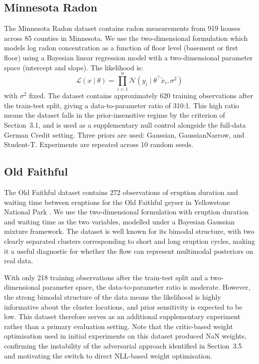 \subsection{Minnesota Radon}

The Minnesota Radon dataset \citep{gelman2007} contains radon measurements 
from 919 houses across 85 counties in 
Minnesota. We use the two-dimensional 
formulation which models log radon 
concentration as a function of floor 
level (basement or first floor) using 
a Bayesian linear regression model with 
a two-dimensional parameter space 
(intercept and slope). The likelihood is:
\begin{equation}
    \mathcal{L}(x \mid \theta) = 
    \prod_{i=1}^n \mathcal{N}(y_i \mid 
    \theta^\top \tilde{x}_i, \sigma^2)
\end{equation}
with $\sigma^2$ fixed. The dataset 
contains approximately 620 training 
observations after the train-test split, 
giving a data-to-parameter ratio of 310:1. 
This high ratio means the dataset falls 
in the prior-insensitive regime by the 
criterion of Section~3.1, and is used 
as a supplementary null control alongside 
the full-data German Credit setting. 
Three priors are used: Gaussian, 
GaussianNarrow, and Student-T. Experiments 
are repeated across 10 random seeds.

\subsection{Old Faithful}

The Old Faithful dataset contains 272 
observations of eruption duration and 
waiting time between eruptions for the 
Old Faithful geyser in Yellowstone 
National Park \citep{azzalini1990}. 
We use the two-dimensional formulation 
with eruption duration and waiting time 
as the two variables, modelled under a 
Bayesian Gaussian mixture framework. 
The dataset is well known for its 
bimodal structure, with two clearly 
separated clusters corresponding to 
short and long eruption cycles, making 
it a useful diagnostic for whether the 
flow can represent multimodal posteriors 
on real data.

With only 218 training observations after 
the train-test split and a two-dimensional 
parameter space, the data-to-parameter 
ratio is moderate. However, the strong 
bimodal structure of the data means the 
likelihood is highly informative about 
the cluster locations, and prior 
sensitivity is expected to be low. This 
dataset therefore serves as an additional 
supplementary experiment rather than a 
primary evaluation setting. Note that 
the critic-based weight optimisation 
used in initial experiments on this 
dataset produced NaN weights, confirming 
the instability of the adversarial 
approach identified in Section~3.5 
and motivating the switch to direct 
NLL-based weight optimisation.

